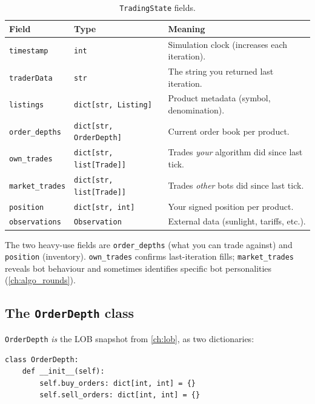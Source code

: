 \begin{table}[htbp]
\centering
\small
\caption{\texttt{TradingState} fields.}
\label{tab:tradingstate}
\begin{tabular}{@{}lll@{}}
\toprule
\textbf{Field} & \textbf{Type} & \textbf{Meaning} \\
\midrule
\texttt{timestamp} & \texttt{int} &
  Simulation clock (increases each iteration). \\
\texttt{traderData} & \texttt{str} &
  The string you returned last iteration. \\
\texttt{listings} & \texttt{dict[str, Listing]} &
  Product metadata (symbol, denomination). \\
\texttt{order\_depths} & \texttt{dict[str, OrderDepth]} &
  Current order book per product. \\
\texttt{own\_trades} & \texttt{dict[str, list[Trade]]} &
  Trades \emph{your} algorithm did since last tick. \\
\texttt{market\_trades} & \texttt{dict[str, list[Trade]]} &
  Trades \emph{other} bots did since last tick. \\
\texttt{position} & \texttt{dict[str, int]} &
  Your signed position per product. \\
\texttt{observations} & \texttt{Observation} &
  External data (sunlight, tariffs, etc.). \\
\bottomrule
\end{tabular}
\end{table}

The two heavy-use fields are \texttt{order\_depths} (what you can trade
against) and \texttt{position} (inventory).  \texttt{own\_trades}
confirms last-iteration fills; \texttt{market\_trades} reveals bot
behaviour and sometimes identifies specific bot personalities
(\cref{ch:algo_rounds}).

\subsection{The \texttt{OrderDepth} class}
\label{sec:orderdepth}

\texttt{OrderDepth} \emph{is} the LOB snapshot from \cref{ch:lob}, as
two dictionaries:

\begin{lstlisting}[caption={\texttt{OrderDepth} class definition.},
  label={lst:orderdepth}]
class OrderDepth:
    def __init__(self):
        self.buy_orders: dict[int, int] = {}
        self.sell_orders: dict[int, int] = {}
\end{lstlisting}

